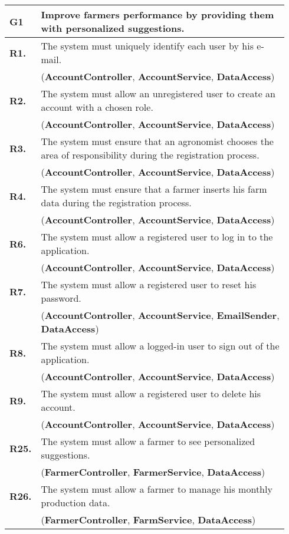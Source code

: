 \begin{longtable}{p{0.06\linewidth} p{0.88\linewidth}} 
    \toprule
    \textbf{G1} & Improve farmers performance by providing them with personalized suggestions. \\
    \midrule		
	\textbf{R1.} & The system must uniquely identify each user by his e-mail. \\
	& (\textbf{AccountController}, \textbf{AccountService}, \textbf{DataAccess})\\
	\textbf{R2.} & The system must allow an unregistered user to create an account with a chosen role. \\
    & (\textbf{AccountController}, \textbf{AccountService}, \textbf{DataAccess})\\
	\textbf{R3.} & The system must ensure that an agronomist chooses the area of responsibility during the registration process. \\
	& (\textbf{AccountController}, \textbf{AccountService}, \textbf{DataAccess})\\
	\textbf{R4.} & The system must ensure that a farmer inserts his farm data during the registration process.\\
	& (\textbf{AccountController}, \textbf{AccountService}, \textbf{DataAccess})\\
	\textbf{R6.} & The system must allow a registered user to log in to the application. \\
	& (\textbf{AccountController}, \textbf{AccountService}, \textbf{DataAccess})\\
	\textbf{R7.} & The system must allow a registered user to reset his password. \\
	& (\textbf{AccountController}, \textbf{AccountService}, \textbf{EmailSender}, \textbf{DataAccess})\\
	\textbf{R8.} & The system must allow a logged-in user to sign out of the application.\\
	& (\textbf{AccountController}, \textbf{AccountService}, \textbf{DataAccess})\\
	\textbf{R9.} & The system must allow a registered user to delete his account. \\
	& (\textbf{AccountController}, \textbf{AccountService}, \textbf{DataAccess})\\
	
	\textbf{R25.} & The system must allow a farmer to see personalized suggestions.\\
	& (\textbf{FarmerController}, \textbf{FarmerService}, \textbf{DataAccess})\\
	\textbf{R26.} & The system must allow a farmer to manage his monthly production data.\\
	& (\textbf{FarmerController}, \textbf{FarmService}, \textbf{DataAccess})\\
	

\end{longtable}
